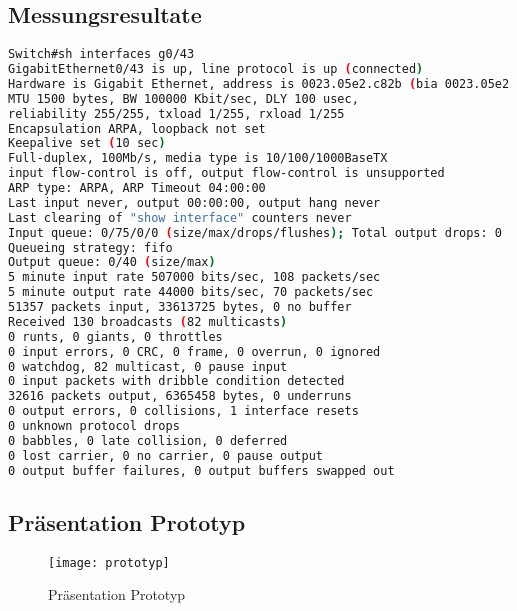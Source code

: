 \subsection{Messungsresultate}
\label{ssec:resultate}
\begin{lstlisting}[backgroundcolor = \color{snippetcolor},
language = bash,
xleftmargin = 0.5cm,
framexleftmargin = 0.1em,
breaklines=true]
Switch#sh interfaces g0/43
GigabitEthernet0/43 is up, line protocol is up (connected)
Hardware is Gigabit Ethernet, address is 0023.05e2.c82b (bia 0023.05e2.c82b)
MTU 1500 bytes, BW 100000 Kbit/sec, DLY 100 usec,
reliability 255/255, txload 1/255, rxload 1/255
Encapsulation ARPA, loopback not set
Keepalive set (10 sec)
Full-duplex, 100Mb/s, media type is 10/100/1000BaseTX
input flow-control is off, output flow-control is unsupported
ARP type: ARPA, ARP Timeout 04:00:00
Last input never, output 00:00:00, output hang never
Last clearing of "show interface" counters never
Input queue: 0/75/0/0 (size/max/drops/flushes); Total output drops: 0
Queueing strategy: fifo
Output queue: 0/40 (size/max)
5 minute input rate 507000 bits/sec, 108 packets/sec
5 minute output rate 44000 bits/sec, 70 packets/sec
51357 packets input, 33613725 bytes, 0 no buffer
Received 130 broadcasts (82 multicasts)
0 runts, 0 giants, 0 throttles
0 input errors, 0 CRC, 0 frame, 0 overrun, 0 ignored
0 watchdog, 82 multicast, 0 pause input
0 input packets with dribble condition detected
32616 packets output, 6365458 bytes, 0 underruns
0 output errors, 0 collisions, 1 interface resets
0 unknown protocol drops
0 babbles, 0 late collision, 0 deferred
0 lost carrier, 0 no carrier, 0 pause output
0 output buffer failures, 0 output buffers swapped out
\end{lstlisting}

\subsection{Präsentation Prototyp}
\label{ssec:prototypfoto}
\begin{figure}[htb!]
	\begin{center}
		\texttt{[image: prototyp]}
		\caption[Prototyp Foto]{Präsentation Prototyp}
		\label{fig:prototyp}
	\end{center}
\end{figure}
\newpage







